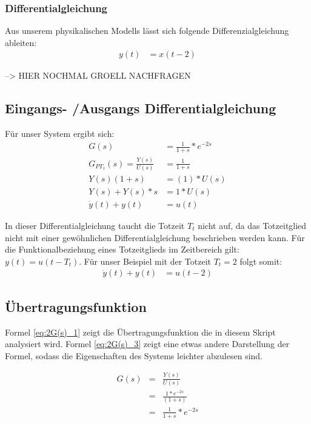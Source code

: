 \subsubsection{Differentialgleichung}
Aus unserem physikalischen Modells lässt sich folgende Differenzialgleichung ableiten:
\begin{align*}
    y(t) & = x(t - 2)
\end{align*}

--> HIER NOCHMAL GROELL NACHFRAGEN

\subsection{Eingangs- /Ausgangs Differentialgleichung}
Für unser System ergibt sich:
\begin{align*}
    G(s) &= \frac{1}{1 + s} * e^{-2s}\\
G_{PT_1}(s) =\frac{Y(s)}{U(s)} &= \frac{1}{1 + s} \\
Y(s)(1+s) &= (1) * U(s) \\
Y(s) + Y(s) *s &= 1*U(s) \\
\dot y(t) + y(t) &= u(t) 
\end{align*}

In dieser Differentialgleichung taucht die Totzeit $T_t$ nicht auf, da das Totzeitglied nicht mit einer gewöhnlichen Differentialgleichung beschrieben werden kann. Für die Funktionalbeziehung eines Totzeitglieds im Zeitbereich gilt: $y(t) = u(t-T_t)$. Für unser Beispiel mit der Totzeit $T_t = 2$ folgt somit:
\begin{align*}
    \dot y(t) + y(t) &= u(t - 2) 
\end{align*}


\subsection{Übertragungsfunktion}

Formel \ref{eq:2G(s)_1} zeigt die Übertragungsfunktion die in diesem Skript analysiert wird. Formel \ref{eq:2G(s)_3} zeigt eine etwas andere Darstellung der Formel, sodass die Eigenschaften des Systems leichter abzulesen sind.

\begin{eqnarray}
    \label{eq:2G(s)_1}
    G(s) &=& \frac{Y(s)}{U(s)} \\
    \label{eq:2G(s)_2}
    &=& \frac{1 * e^{-2s}}{(1+s)} \\
    \label{eq:2G(s)_3}
    &=& \frac{1}{1 + s} * e^{-2s}
\end{eqnarray}

